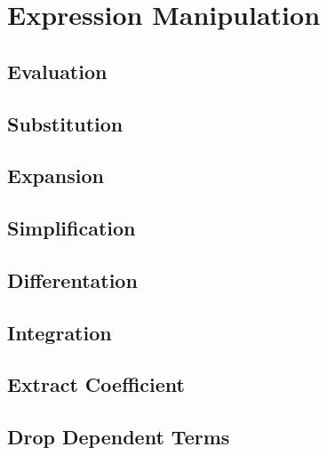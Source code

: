 \chapter{Expression Manipulation} \label{chap:manipulation}

 \section{Evaluation}

 \section{Substitution}

 \section{Expansion}

 \section{Simplification}

 \section{Differentation}

 \section{Integration}

 \section{Extract Coefficient}

 \section{Drop Dependent Terms}





